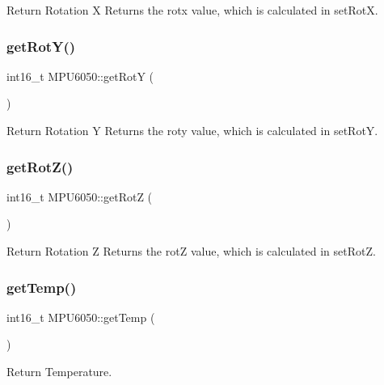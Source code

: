 Return Rotation X  Returns the rotx value, which is calculated in set\+RotX. 

\mbox{\label{class_m_p_u6050_abbbcdf91120387b4c3a403640622c431}} 
\subsubsection{\texorpdfstring{get\+Rot\+Y()}{getRotY()}}
{\footnotesize\ttfamily int16\+\_\+t M\+P\+U6050\+::get\+RotY (\begin{DoxyParamCaption}{ }\end{DoxyParamCaption})}



Return Rotation Y  Returns the roty value, which is calculated in set\+RotY. 

\mbox{\label{class_m_p_u6050_a82a4cae5502dff15b75aa43ab0a03ebf}} 
\subsubsection{\texorpdfstring{get\+Rot\+Z()}{getRotZ()}}
{\footnotesize\ttfamily int16\+\_\+t M\+P\+U6050\+::get\+RotZ (\begin{DoxyParamCaption}{ }\end{DoxyParamCaption})}



Return Rotation Z  Returns the rotZ value, which is calculated in set\+RotZ. 

\mbox{\label{class_m_p_u6050_a7d0647ec805da5e48d683bc39d9e5a6c}} 
\subsubsection{\texorpdfstring{get\+Temp()}{getTemp()}}
{\footnotesize\ttfamily int16\+\_\+t M\+P\+U6050\+::get\+Temp (\begin{DoxyParamCaption}{ }\end{DoxyParamCaption})}



Return Temperature. 

